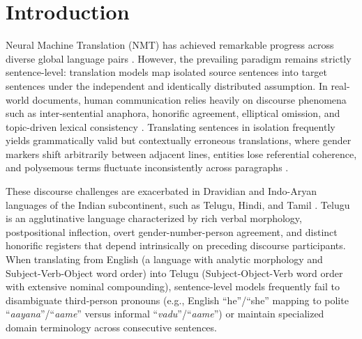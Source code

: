 \documentclass[conference]{IEEEtran}
\begin{document}
\section{Introduction}
\label{sec:intro}

Neural Machine Translation (NMT) has achieved remarkable progress across diverse global language pairs \cite{vaswani2017attention, costajussa2022nllb}. However, the prevailing paradigm remains strictly sentence-level: translation models map isolated source sentences into target sentences under the independent and identically distributed assumption. In real-world documents, human communication relies heavily on discourse phenomena such as inter-sentential anaphora, honorific agreement, elliptical omission, and topic-driven lexical consistency \cite{voita-etal-2018-context, voita-etal-2019-good, maruf-etal-2021-survey}. Translating sentences in isolation frequently yields grammatically valid but contextually erroneous translations, where gender markers shift arbitrarily between adjacent lines, entities lose referential coherence, and polysemous terms fluctuate inconsistently across paragraphs \cite{bawden-etal-2018-evaluating}.

These discourse challenges are exacerbated in Dravidian and Indo-Aryan languages of the Indian subcontinent, such as Telugu, Hindi, and Tamil \cite{ramesh-etal-2022-samanantar, gala2023indictrans}. Telugu is an agglutinative language characterized by rich verbal morphology, postpositional inflection, overt gender-number-person agreement, and distinct honorific registers that depend intrinsically on preceding discourse participants. When translating from English (a language with analytic morphology and Subject-Verb-Object word order) into Telugu (Subject-Object-Verb word order with extensive nominal compounding), sentence-level models frequently fail to disambiguate third-person pronouns (e.g., English ``he''/``she'' mapping to polite ``\textit{aayana}''/``\textit{aame}'' versus informal ``\textit{vadu}''/``\textit{aame}'') or maintain specialized domain terminology across consecutive sentences.
\end{document}
